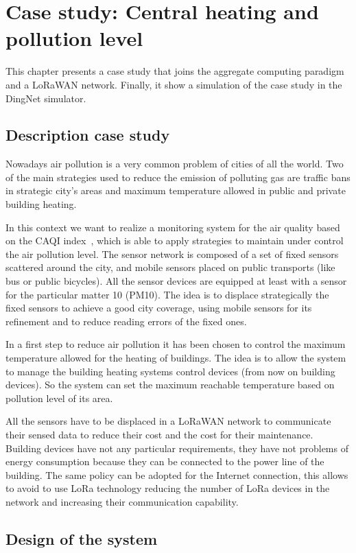 \chapter{Case study: Central heating and pollution level}
\label{chap:case-staudyAC}
This chapter presents a case study that joins the aggregate computing paradigm and a LoRaWAN network. Finally, it show a simulation of the case study in the DingNet simulator.

\section{Description case study}
Nowadays air pollution is a very common problem of cities of all the world.
Two of the main strategies used to reduce the emission of polluting gas are traffic bans in strategic city's areas and maximum temperature allowed in public and private building heating.

In this context we want to realize a monitoring system for the air quality based on the CAQI index~\cite{CAQI}, which is able to apply strategies to maintain under control the air pollution level.
The sensor network is composed of a set of fixed sensors scattered around the city, and mobile sensors placed on public transports (like bus or public bicycles).
All the sensor devices are equipped at least with a sensor for the particular matter 10 (PM10).
The idea is to displace strategically the fixed sensors to achieve a good city coverage, using mobile sensors for its refinement and to reduce reading errors of the fixed ones.

In a first step to reduce air pollution it has been chosen to control the maximum temperature allowed for the heating of buildings.
The idea is to allow the system to manage the building heating systems control devices (from now on building devices). So the system can set the maximum reachable temperature based on pollution level of its area.

All the sensors have to be displaced in a LoRaWAN network to communicate their sensed data to reduce their cost and the cost for their maintenance. 
Building devices have not any particular requirements, they have not problems of energy consumption because they can be connected to the power line of the building.
The same policy can be adopted for the Internet connection, this allows to avoid to use LoRa technology reducing the number of LoRa devices in the network and increasing their communication capability.

\section{Design of the system}


